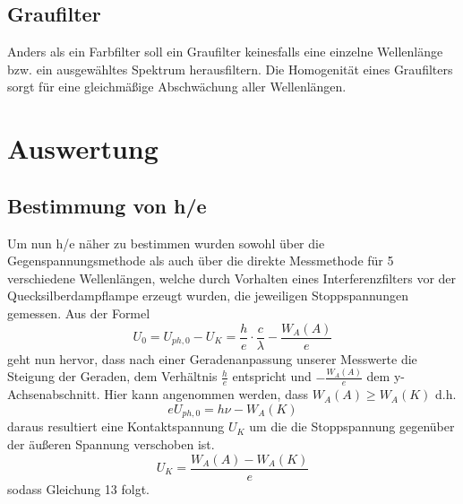 \documentclass{scrartcl}
\begin{document}
	\subsection{Graufilter}
		Anders als ein Farbfilter soll ein Graufilter keinesfalls eine einzelne Wellenlänge bzw. ein ausgewähltes Spektrum 
		herausfiltern. Die Homogenität eines Graufilters sorgt für eine gleichmäßige Abschwächung aller Wellenlängen.
\section{Auswertung}
	\subsection{Bestimmung von h/e}
		Um nun h/e näher zu bestimmen wurden sowohl über die Gegenspannungsmethode als auch über die direkte Messmethode
		für 5 verschiedene Wellenlängen, welche durch Vorhalten eines Interferenzfilters vor der Quecksilberdampflampe erzeugt wurden,
		die jeweiligen Stoppspannungen gemessen. Aus der Formel
		\begin{equation}
			U_0 = U_{ph,0} - U_K = \frac{h}{e}\cdot \frac{c}{\lambda} - \frac{W_A(A)}{e}
		\end{equation}
		geht nun hervor, dass nach einer Geradenanpassung unserer Messwerte die Steigung der Geraden, dem Verhältnis
		$\frac{h}{e}$ entspricht und $-\frac{W_A(A)}{e}$ dem y-Achsenabschnitt.
		Hier kann angenommen werden, dass $W_A(A)\geq W_A(K)$ d.h.
		\begin{equation}
			eU_{ph,0} = h\nu - W_A(K)
		\end{equation} 
		daraus resultiert eine Kontaktspannung $U_K$ um die die Stoppspannung gegenüber der äußeren Spannung verschoben ist.
		\begin{equation}
			U_K = \frac{W_A(A)-W_A(K)}{e}
		\end{equation}
		sodass Gleichung 13 folgt.
\end{document}
